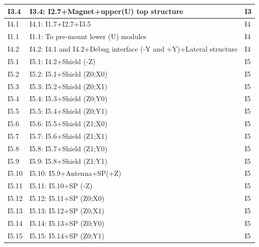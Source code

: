 \begin{table}[!htb]
\begin{tabular}{|l|l|l|}
        I3.4     & I3.4: I2.7+Magnet+upper(U) top structure                          & {I3} \\ \hline
        I4.1     & I4.1: I1.7+I2.7+I3.5                                              & {I4} \\ \hline
	I1.1     & I1.1: To pre-mount lower (U) modules                              & {I4} \\ \hline
        I4.2     & I4.2: I4.1 and I4.2+Debug interface (-Y and +Y)+Lateral structure & {I4} \\ \hline
        I5.1     & I5.1: I4.2+Shield (-Z)                                            & {I5} \\ \hline
        I5.2     & I5.2: I5.1+Shield (Z0;X0)                                         & {I5} \\ \hline
        I5.3     & I5.3: I5.2+Shield (Z0;X1)                                         & {I5} \\ \hline
        I5.4     & I5.4: I5.3+Shield (Z0;Y0)                                         & {I5} \\ \hline
        I5.5     & I5.5: I5.4+Shield (Z0;Y1)                                         & {I5} \\ \hline
        I5.6     & I5.6: I5.5+Shield (Z1;X0)                                         & {I5} \\ \hline
        I5.7     & I5.7: I5.6+Shield (Z1;X1)                                         & {I5} \\ \hline
        I5.8     & I5.8: I5.7+Shield (Z1;Y0)                                         & {I5} \\ \hline
        I5.9     & I5.9: I5.8+Shield (Z1;Y1)                                         & {I5} \\ \hline
        I5.10    & I5.10: I5.9+Antenna+SP(+Z)                                        & {I5} \\ \hline
        I5.11    & I5.11: I5.10+SP (-Z)                                              & {I5} \\ \hline
        I5.12    & I5.12: I5.11+SP (Z0;X0)                                           & {I5} \\ \hline
        I5.13    & I5.13: I5.12+SP (Z0;X1)                                           & {I5} \\ \hline
        I5.14    & I5.14: I5.13+SP (Z0;Y0)                                           & {I5} \\ \hline
        I5.15    & I5.15: I5.14+SP (Z0;Y1)                                           & {I5} \\ \hline

\end{tabular}
\end{table}
